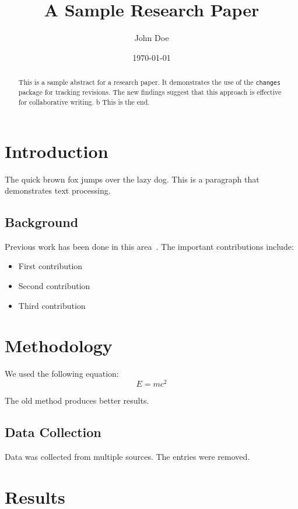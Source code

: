 \documentclass[12pt]{article}
\title{A Sample Research Paper}
\author{John Doe}
\date{\today}
\begin{document}
\maketitle

\begin{abstract}
This is a sample abstract for a research paper. It demonstrates the use of the \texttt{changes} package for tracking revisions. The new findings suggest that this approach is effective for collaborative writing.
b
This is the end.
\end{abstract}

\section{Introduction}
\label{sec:intro}

The quick brown fox jumps over the lazy dog. This is a  paragraph that demonstrates text processing.

\subsection{Background}
\label{subsec:background}

Previous work has been done in this area~\cite{ref2021}. The important contributions include:
\begin{itemize}
    \item First contribution
    \item Second contribution
    \item Third contribution
\end{itemize}

\section{Methodology}
\label{sec:method}

We used the following equation:
\begin{equation}
    E = mc^2
    \label{eq:energy}
\end{equation}

The old method produces better results.

\subsection{Data Collection}
Data was collected from multiple sources. The  entries were removed.

\section{Results}
\label{sec:results}
\end{document}
